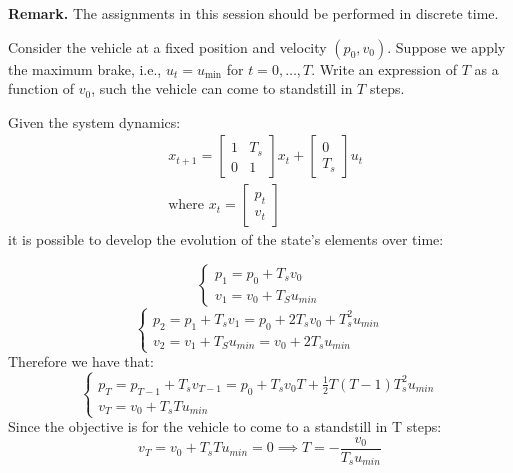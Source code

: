 \documentclass[]{article}
\begin{document}
\textbf{Remark.} The assignments in this session should be performed in discrete time.

\begin{assignment}
	Consider the vehicle at a fixed position and velocity $(p_0, v_0)$.
	Suppose we apply the maximum brake, i.e., $u_t = u_{\min}$ for $t = 0, \dots, T$.
	Write an expression of $T$ as a function of $v_0$, such the vehicle can come to standstill in $T$ steps.
\end{assignment}

\begin{flushleft}
Given the system dynamics:
\begin{equation}
	\begin{aligned}
		&x_{t+1} = \begin{bmatrix}
			1 & T_s \\ 
			0 & 1
		\end{bmatrix} x_t +
		\begin{bmatrix}
			0 \\ T_s
		\end{bmatrix} u_t \\
		&\text{where } x_t = \begin{bmatrix}
			p_t \\ 
			v_t
		\end{bmatrix}
	\end{aligned}
\end{equation}
it is possible to develop the evolution of the state's elements over time:
\end{flushleft}
\begin{equation}
	\begin{cases}
		p_1 = p_0 + T_s v_0 \\
		v_1 = v_0 + T_S u_{min}
	\end{cases}
\end{equation}
\begin{equation}
	\begin{cases}
		p_2 = p_1 + T_s v_1 = p_0 + 2 T_s v_0 + T_s^2 u_{min} \\
		v_2 = v_1 + T_S u_{min} = v_0 + 2 T_s u_{min}
	\end{cases}
\end{equation}
Therefore we have that:
\begin{equation}
	\begin{cases}
		p_T = p_{T-1} + T_s v_{T-1} = p_0 + T_s v_0 T + \frac{1}{2} T (T-1) T_s^2 u_{min} \\
		v_T = v_0 + T_s T u_{min}
	\end{cases}
\end{equation}
Since the objective is for the vehicle to come to a standstill in T steps:
\begin{equation}
	v_T = v_0 + T_s T u_{min} = 0 \implies T = -\frac{v_0}{T_s u_{min}}
\end{equation}
\end{document}
